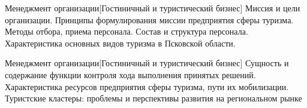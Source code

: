 \documentclass[
	11pt,
	a4paper,
	]
	{article}
\begin{document}
\vfill



\begin{minipage}[t][\miniH]{\miniL}\centering
	 {Менеджмент организации}[Гостиничный и туристический бизнес]
		{
			Миссия и цели организации. Принципы формулирования миссии предприятия сферы туризма.
		}{
			Методы отбора, приема персонала. Состав и структура персонала.
		}{
			Характеристика основных видов туризма в Псковской области.
		}
	\lowGE
\end{minipage}





\begin{minipage}[t][\miniH]{\miniL}\centering
	 {Менеджмент организации}[Гостиничный и туристический бизнес]
		{
			Сущность и содержание функции контроля хода выполнения принятых решений.
		}{
			Характеристика ресурсов предприятия сферы туризма, пути их мобилизации.
		}{
			Туристские кластеры: проблемы и перспективы развития на региональном рынке
		}
	\lowGE
\end{minipage}

\vfill

	
\end{document}
